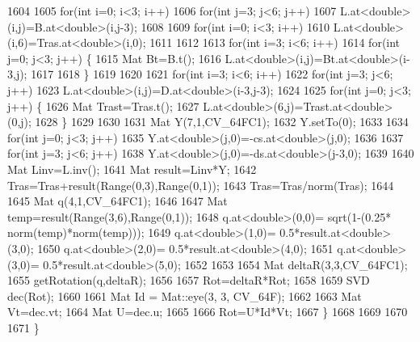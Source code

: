 \begin{DoxyCode}
1604 
1605         \textcolor{keywordflow}{for}(\textcolor{keywordtype}{int} i=0; i<3; i++)
1606             \textcolor{keywordflow}{for}(\textcolor{keywordtype}{int} j=3; j<6; j++)
1607                 L.at<\textcolor{keywordtype}{double}>(i,j)=B.at<\textcolor{keywordtype}{double}>(i,j-3);
1608     
1609         \textcolor{keywordflow}{for}(\textcolor{keywordtype}{int} i=0; i<3; i++)
1610                 L.at<\textcolor{keywordtype}{double}>(i,6)=Tras.at<\textcolor{keywordtype}{double}>(i,0);
1611 
1612 
1613         \textcolor{keywordflow}{for}(\textcolor{keywordtype}{int} i=3; i<6; i++)
1614             \textcolor{keywordflow}{for}(\textcolor{keywordtype}{int} j=0; j<3; j++) \{
1615                 Mat Bt=B.t();
1616                 L.at<\textcolor{keywordtype}{double}>(i,j)=Bt.at<\textcolor{keywordtype}{double}>(i-3,j);
1617 
1618             \}
1619 
1620 
1621         \textcolor{keywordflow}{for}(\textcolor{keywordtype}{int} i=3; i<6; i++)
1622             \textcolor{keywordflow}{for}(\textcolor{keywordtype}{int} j=3; j<6; j++)
1623                 L.at<\textcolor{keywordtype}{double}>(i,j)=D.at<\textcolor{keywordtype}{double}>(i-3,j-3);
1624 
1625         \textcolor{keywordflow}{for}(\textcolor{keywordtype}{int} j=0; j<3; j++) \{
1626                 Mat Trast=Tras.t();
1627                 L.at<\textcolor{keywordtype}{double}>(6,j)=Trast.at<\textcolor{keywordtype}{double}>(0,j);
1628         \}
1629 
1630 
1631         Mat Y(7,1,CV\_64FC1);
1632         Y.setTo(0);
1633 
1634         \textcolor{keywordflow}{for}(\textcolor{keywordtype}{int} j=0; j<3; j++)
1635                 Y.at<\textcolor{keywordtype}{double}>(j,0)=-cs.at<\textcolor{keywordtype}{double}>(j,0);
1636 
1637         \textcolor{keywordflow}{for}(\textcolor{keywordtype}{int} j=3; j<6; j++)
1638                 Y.at<\textcolor{keywordtype}{double}>(j,0)=-ds.at<\textcolor{keywordtype}{double}>(j-3,0);
1639 
1640         Mat Linv=L.inv();
1641         Mat result=Linv*Y;
1642         Tras=Tras+result(Range(0,3),Range(0,1));
1643         Tras=Tras/norm(Tras);
1644 
1645         Mat q(4,1,CV\_64FC1);
1646 
1647         Mat temp=result(Range(3,6),Range(0,1));       
1648         q.at<\textcolor{keywordtype}{double}>(0,0)= sqrt(1-(0.25* norm(temp)*norm(temp)));
1649         q.at<\textcolor{keywordtype}{double}>(1,0)= 0.5*result.at<\textcolor{keywordtype}{double}>(3,0);
1650         q.at<\textcolor{keywordtype}{double}>(2,0)= 0.5*result.at<\textcolor{keywordtype}{double}>(4,0);
1651         q.at<\textcolor{keywordtype}{double}>(3,0)= 0.5*result.at<\textcolor{keywordtype}{double}>(5,0);
1652 
1653 
1654         Mat deltaR(3,3,CV\_64FC1);
1655         getRotation(q,deltaR);
1656 
1657         Rot=deltaR*Rot;
1658 
1659         SVD dec(Rot);
1660 
1661         Mat Id = Mat::eye(3, 3, CV\_64F);
1662 
1663         Mat Vt=dec.vt;
1664         Mat U=dec.u;
1665 
1666         Rot=U*Id*Vt;
1667     \}
1668 
1669 
1670 
1671 \}
\end{DoxyCode}

